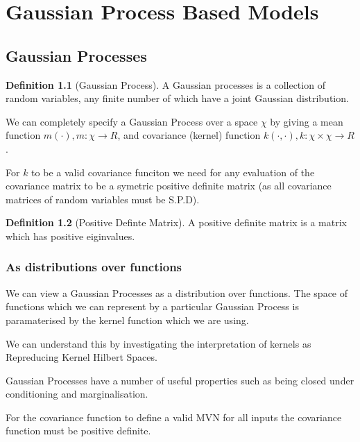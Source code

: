 \documentclass[12pt, a4paper]{report}
\theoremstyle{definition}
\newtheorem{definition}{Definition}[section]
\begin{document}
\chapter{Gaussian Process Based Models}
\label{Chap4}


\section{Gaussian Processes}


\begin{definition}[Gaussian Process]
    A Gaussian processes is a collection of random variables, any finite number of which have a joint Gaussian distribution. \cite[]{rasmussen2003gaussian}
\end{definition}


We can completely specify a Gaussian Process over a space $\chi$ by giving a mean function $m(\cdot), m : \chi \rightarrow R$, and covariance (kernel) function $k(\cdot, \cdot), k: \chi \times \chi \rightarrow R$.


For $k$ to be a valid covariance funciton we need for any evaluation of the covariance matrix to be a symetric positive definite matrix (as all covariance matrices of random variables must be S.P.D).

\begin{definition}[Positive Definte Matrix]
    A positive definite matrix is a matrix which has positive eiginvalues.
\end{definition}

\subsection{As distributions over functions}

We can view a Gaussian Processes as a distribution over functions. The space of functions which we can represent by a particular Gaussian Process is paramaterised by the kernel function which we are using.

We can understand this by investigating the interpretation of kernels as Repreducing Kernel Hilbert Spaces.





Gaussian Processes have a number of useful properties such as being closed under conditioning and marginalisation.

For the covariance function to define a valid MVN for all inputs the covariance function must be positive definite.
\end{document}
